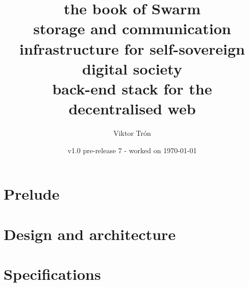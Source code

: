 \documentclass[a4paper,12pt,openany,hyperfootnotes,hidelinks]{scrbook}
\title{\Huge\sc the book of Swarm\\
\Large storage and communication infrastructure for self-sovereign digital society\\
back-end stack for the decentralised web}
\author{Viktor Trón}
\date{v1.0 pre-release 7 - worked on \today}
\newif\ifdraft
\begin{document}
\frontmatter
\maketitle
\setcounter{tocdepth}{2}


\ifdraft
Instructions for compiling and distributing.

These are hidden if conditional text is not shown (when publishing a version).

\begin{enumerate}
    \item any version being worked on should be named "Version vX - worked on";
    \item when publishing, "worked on" should be removed; 
    \item drafttrue line should be commented out removing conditional text upon compilation;
    \item PDF should be generated, saved and pushed to Github repo \\ (https://github.com/ethersphere/publish-bookofswarm/tree/master/pdfs); \item verify that last commit was autodeployed to Swarm \\ (https://swarm-gateways.net/bzz:/latest.bookofswarm.eth/the-book-of-swarm-viktor-tron.pdf);
    \item PDF commit in Github repo should be named with version number;
    \item version number in Latex should be bumped up and "worked on" note added: "Version v(X+1) - worked on";
    \item Goto 1.
\end{enumerate}
\fi


\tableofcontents
\listoffigures

\label{sec:toc}
 
\mainmatter
\part{Prelude} \label{part:preface}

\part{Design and architecture} \label{part:designarchitecture}

\part{Specifications}
\label{part:specifications}

{}

\appendix
\end{document}
